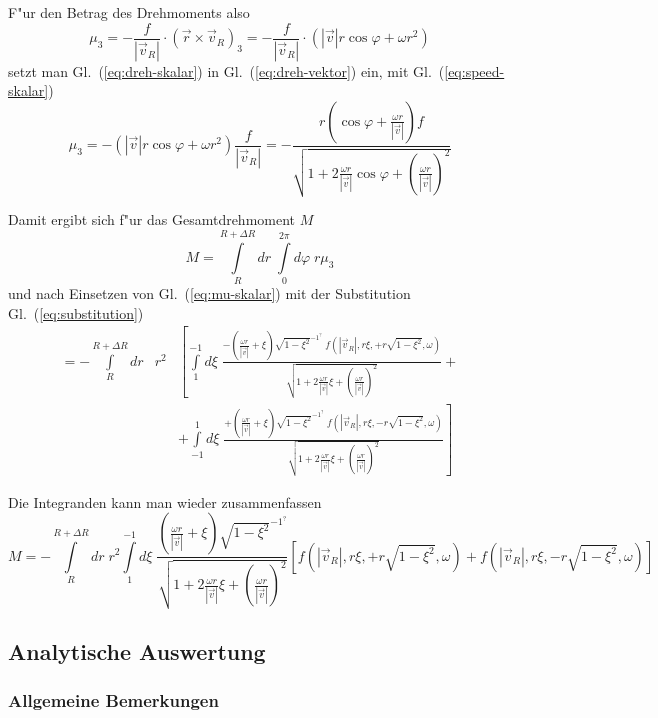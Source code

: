 \documentclass[a4paper]{report}
\newcommand{\eqlab}[1]{\label{eq:#1}}
\newcommand{\eqref}[1]{Gl.~(\ref{eq:#1})}
\newcommand{\vRo}{ \vec{v}   }   %
\newcommand{\vRi}{ \vec{v}_R }   %
\newcommand{\vRiAbsDivvRoCOS}[1]{\sqrt{\displaystyle
    1 + 2\frac{\omega #1}{|\vRo|}\cos\varphi +
    \left( \frac{\omega #1}{|\vRo|} \right)^2 } }
\newcommand{\vRiAbsDivvRoXI}[1]{\sqrt{\displaystyle
    1 + 2\frac{\omega #1}{|\vRo|}\xi +
    \left( \frac{\omega #1}{|\vRo|} \right)^2 } }
\newcommand{\SubstCos}{ \sqrt{1-\xi^2} }
\newcommand{\fpolar}[2]{ f( |\vRi| , #2 \xi, #1 #2 \SubstCos ,\omega) }
\newcommand{\Int}{\int\limits}
\begin{document}
F"ur den Betrag des Drehmoments also
%
\begin{equation}
\mu_3 = -\frac{f}{|\vRi|}\cdot \left(\vec{r}\times\vec{v}_R\right)_3
      = -\frac{f}{|\vRi|}\cdot \left(|\vRo| r \cos\varphi + \omega r^2 \right)
\eqlab{dreh-skalar}\end{equation}
%
setzt man \eqref{dreh-skalar} in \eqref{dreh-vektor} ein, mit
\eqref{speed-skalar}
%
\begin{equation}
\mu_3 = -(|\vRo| r \cos\varphi + \omega r^2) \frac{f}{|\vRi|} =
- \frac{r(\cos\varphi + \frac{\omega r}{|\vRo|}) f }{ \vRiAbsDivvRoCOS{r} } \eqlab{mu-skalar}
\end{equation}

Damit ergibt sich f"ur das Gesamtdrehmoment $ M $
%
\begin{equation}
M = \Int_{R}^{R+\Delta R}dr\;\Int_{0}^{2\pi}d\varphi\;r \mu_3
\end{equation}
%
und nach Einsetzen von \eqref{mu-skalar} mit der Substitution
\eqref{substitution}
%
\begin{eqnarray}
= -\Int_{R}^{R+\Delta R} dr & r^2 &
	\left[
	\Int_{1}^{-1}d\xi\; \frac{-\left(\frac{\omega r}{|\vRo|}+\xi\right)
				  \SubstCos^{-1^?}\; \fpolar{+}{r} }{ \vRiAbsDivvRoXI{r} }  +
	\right.\\ &&
	+\left.
	\Int_{-1}^{1}d\xi\; \frac{+\left(\frac{\omega r}{|\vRo|}+\xi\right)
				  \SubstCos^{-1^?}\; \fpolar{-}{r} }{ \vRiAbsDivvRoXI{r} }
	\right]
	\nonumber
\end{eqnarray}

Die Integranden kann man wieder zusammenfassen
%
\begin{equation}
M = -\Int_{R}^{R+\Delta R} dr\; r^2
    \Int_{1}^{-1}d\xi\;
	\frac{\left(\frac{\omega r}{|\vRo|}+\xi\right)   \SubstCos^{-1^?} }{ \vRiAbsDivvRoXI{r} }
	\left[ \fpolar{+}{r} + \fpolar{-}{r} \right]
    \eqlab{drehmoment}
\end{equation}

\subsection{Analytische Auswertung}

\subsubsection{Allgemeine Bemerkungen}
\end{document}
